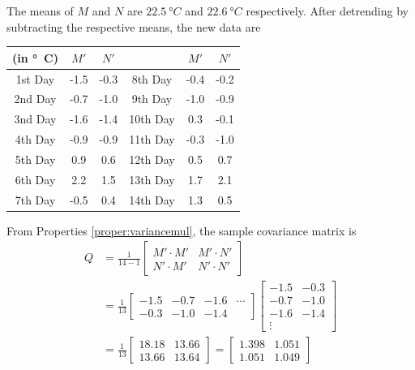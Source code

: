 \begin{solution}
The means of $M$ and $N$ are $\SI{22.5}{\degree C}$ and $\SI{22.6}{\degree C}$ respectively. After detrending by subtracting the respective means, the new data are
\begin{center}
\begin{tabular}{|c|c|c|c|c|c|}
\hline
(in \si{\degree C}) & $M'$ & $N'$ & & $M'$ & $N'$ \\
\hline
1st Day & -1.5 & -0.3 & 8th Day & -0.4 & -0.2 \\
\hline
2nd Day & -0.7 & -1.0 & 9th Day & -1.0 & -0.9 \\
\hline
3nd Day & -1.6 & -1.4 & 10th Day & 0.3 & -0.1 \\
\hline
4th Day & -0.9 & -0.9 & 11th Day & -0.3 & -1.0 \\
\hline
5th Day & 0.9 & 0.6 & 12th Day & 0.5 & 0.7 \\
\hline 
6th Day & 2.2 & 1.5 & 13th Day & 1.7 & 2.1 \\
\hline 
7th Day & -0.5 & 0.4 & 14th Day & 1.3 & 0.5 \\
\hline
\end{tabular}
\end{center}
From Properties \ref{proper:variancemul}, the sample covariance matrix is
\begin{align*}
Q &= 
\frac{1}{14-1}
\begin{bmatrix}
M' \cdot M' & M' \cdot N' \\
N' \cdot M' & N' \cdot N' 
\end{bmatrix} \\
&= \frac{1}{13}
\begin{bmatrix}
-1.5 & -0.7 & -1.6 & \cdots \\
-0.3 & -1.0 & -1.4 
\end{bmatrix}
\begin{bmatrix}
-1.5 & -0.3 \\
-0.7 & -1.0 \\
-1.6 & -1.4 \\
\vdots
\end{bmatrix} \\
&= \frac{1}{13}
\begin{bmatrix}
18.18 & 13.66 \\
13.66 & 13.64
\end{bmatrix} = 
\begin{bmatrix}
1.398 & 1.051 \\
1.051 & 1.049
\end{bmatrix}
\end{align*}

\end{solution}
